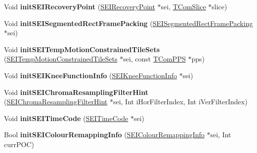 \begin{DoxyCompactItemize}
\mbox{\label{class_s_e_i_encoder_a218e6403fc91810d4c0a489411663236}} 
Void {\bfseries init\+S\+E\+I\+Recovery\+Point} (\hyperlink{class_s_e_i_recovery_point}{S\+E\+I\+Recovery\+Point} $\ast$sei, \hyperlink{class_t_com_slice}{T\+Com\+Slice} $\ast$slice)
\item 
\mbox{\label{class_s_e_i_encoder_a2e3dfdc3c49801e80538d62555e8d483}} 
Void {\bfseries init\+S\+E\+I\+Segmented\+Rect\+Frame\+Packing} (\hyperlink{class_s_e_i_segmented_rect_frame_packing}{S\+E\+I\+Segmented\+Rect\+Frame\+Packing} $\ast$sei)
\item 
\mbox{\label{class_s_e_i_encoder_abfc18ac41f20fa57a92a7e2d9a798df2}} 
Void {\bfseries init\+S\+E\+I\+Temp\+Motion\+Constrained\+Tile\+Sets} (\hyperlink{class_s_e_i_temp_motion_constrained_tile_sets}{S\+E\+I\+Temp\+Motion\+Constrained\+Tile\+Sets} $\ast$sei, const \hyperlink{class_t_com_p_p_s}{T\+Com\+P\+PS} $\ast$pps)
\item 
\mbox{\label{class_s_e_i_encoder_a7df76ce6015c3d2c72092a548af4b2c0}} 
Void {\bfseries init\+S\+E\+I\+Knee\+Function\+Info} (\hyperlink{class_s_e_i_knee_function_info}{S\+E\+I\+Knee\+Function\+Info} $\ast$sei)
\item 
\mbox{\label{class_s_e_i_encoder_a9c853e6649fb587667a2245f060b3af1}} 
Void {\bfseries init\+S\+E\+I\+Chroma\+Resampling\+Filter\+Hint} (\hyperlink{class_s_e_i_chroma_resampling_filter_hint}{S\+E\+I\+Chroma\+Resampling\+Filter\+Hint} $\ast$sei, Int i\+Hor\+Filter\+Index, Int i\+Ver\+Filter\+Index)
\item 
\mbox{\label{class_s_e_i_encoder_ae18fdce999c19b17c8dd2cb7c2660d75}} 
Void {\bfseries init\+S\+E\+I\+Time\+Code} (\hyperlink{class_s_e_i_time_code}{S\+E\+I\+Time\+Code} $\ast$sei)
\item 
\mbox{\label{class_s_e_i_encoder_a3bd00ffb5f95a153bfe5c3c20ed1fbde}} 
Bool {\bfseries init\+S\+E\+I\+Colour\+Remapping\+Info} (\hyperlink{class_s_e_i_colour_remapping_info}{S\+E\+I\+Colour\+Remapping\+Info} $\ast$sei, Int curr\+P\+OC)
\item 
\mbox{\label{class_s_e_i_encoder_a76ec3fabc1aa59a47c57cffbb2957010}} 

\end{DoxyCompactItemize}
